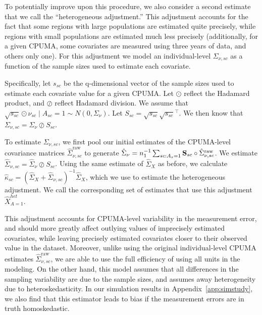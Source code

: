 To potentially improve upon this procedure, we also consider a second estimate that we call the ``heterogeneous adjustment.'' This adjustment accounts for the fact that some regions with large populations are estimated quite precisely, while regions with small populations are estimated much less precisely (additionally, for a given CPUMA, some covariates are measured using three years of data, and others only one). For this adjustment we model an individual-level $\Sigma_{\nu, sc}$ as a function of the sample sizes used to estimate each covariate. 

Specifically, let $s_{sc}$ be the q-dimensional vector of the sample sizes used to estimate each covariate value for a given CPUMA. Let $\odot$ reflect the Hadamard product, and $\oslash$ reflect Hadamard division. We assume that $\sqrt{s_{sc}} \odot \nu_{sc} \mid A_{sc} = 1 \sim N(0, \Sigma_{\nu})$. Let $S_{sc} = \sqrt{s_{sc}}\sqrt{s_{sc}}^\top$. We then know that $\Sigma_{\nu, sc} = \Sigma_{\nu} \oslash S_{sc}$.

To estimate $\Sigma_{\nu, sc}$, we first pool our initial estimates of the CPUMA-level covariance matrices $\hat{\Sigma}_{\nu, sc}^{\text{raw}}$ to generate $\hat{\Sigma}_{\nu} = n_1^{-1}\sum_{sc: A_s = 1} \mathbf{S}_{sc} \circ \hat{\Sigma}_{\nu, sc}^{\text{raw}}$. We estimate $\hat{\Sigma}_{\nu, sc} = \hat{\Sigma}_{\nu} \oslash S_{sc}$. Using the same estimate of $\hat{\Sigma}_X$ as before, we calculate $\hat{\kappa}_{sc} = (\hat{\Sigma}_{X} + \hat{\Sigma}_{\nu, sc})^{-1}\hat{\Sigma}_X$, which we use to estimate the heterogeneous adjustment. We call the corresponding set of estimates that use this adjustment $\hat{X}_{A=1}^{het}$.

This adjustment accounts for CPUMA-level variability in the measurement error, and should more greatly affect outlying values of imprecisely estimated covariates, while leaving precisely estimated covariates closer to their observed value in the dataset. Moreover, unlike using the original individual-level CPUMA estimates $\hat{\Sigma}_{\nu, sc}^{\text{raw}}$, we are able to use the full efficiency of using all units in the modeling. On the other hand, this model assumes that all differences in the sampling variability are due to the sample sizes, and assumes away heterogeneity due to heteroskedasticity. In our simulation results in Appendix~\ref{app:simstudy}, we also find that this estimator leads to bias if the measurement errors are in truth homoskedastic. 

